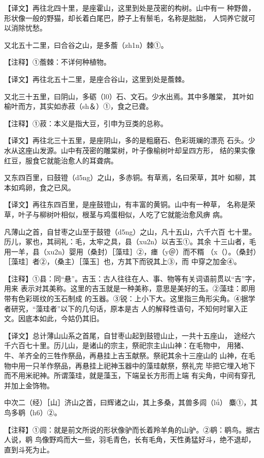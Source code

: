 \documentclass[a4paper,12pt,UTF8,twoside]{ctexbook}
\begin{document}
【译文】再往北四十里，是座霍山，这里到处是茂密的构树。山中有一 种野兽，形状像一般的野猫，却长着白尾巴，脖子上有鬃毛，名称是胐胐， 人饲养它就可以消除忧愁。

又北五十二里，曰合谷之山，是多薝（zh1n）棘①。

【注释】①薝棘：不详何种植物。

【译文】再往北五十二里，是座合谷山，这里到处是薝棘。

又北三十五里，曰阴山，多砺（l0）石、文石。少水出焉。其中多雕棠， 其叶如榆叶而方，其实如赤菽（sh＆）①，食之已聋。

【注释】①菽：本义是指大豆，引申为豆类的总称。

【译文】再往北三十五里，是座阴山，多的是粗磨石、色彩斑斓的漂亮 石头。少水从这座山发源。山中有茂密的雕棠树，叶子像榆树叶却呈四方形， 结的果实像红豆，服食它就能治愈人的耳聋病。

又东四百里，曰鼓镫（d5ng）之山，多赤铜。有草焉，名曰荣草，其叶 如柳，其本如鸡卵，食之已风。

【译文】再往东四百里，是座鼓镫山，有丰富的黄铜。山中有一种草， 名称是荣草，叶子与柳树叶相似，根茎与鸡蛋相似，人吃了它就能治愈风痹 病。

凡薄山之首，自甘枣之山至于鼓镫（d5ng）之山，凡十五山，六千六百 七十里。历儿，冢也，其祠礼：毛，太牢之具，县（xu2n）以吉玉①。其余 十三山者，毛用一羊，县（xu2n）婴用（桑封）［藻珪］②，瘗（y＠）而不糈 （x（）。（桑封）［藻珪］者②，（桑主）［藻玉］也，方其下而锐其上③，而 中穿之加金④。

【注释】①县：同“悬”。吉玉：古人往往在人、事、物等有关词语前贯以“吉”字，用来 表示对其美称。这里的吉玉就是一种美称，意思是美好的玉。②藻珪：即用带有色彩斑纹的玉石制成 的玉器。③锐：上小下大。这里指三角形尖角。④据学者研究，“藻珪者”以下的几句话，原本是古 人的解释性语句，不知何时窜入正文。因底本如此，今姑仍其旧。

【译文】总计薄山山系之首尾，自甘枣山起到鼓镫山止，一共十五座山， 途经六千六百七十里。历儿山，是诸山的宗主，祭祀宗主山山神：在毛物中， 用猪、牛、羊齐全的三牲作祭品，再悬挂上吉玉献祭。祭祀其余十三座山的 山神，在毛物中用一只羊作祭品，再悬挂上祀神玉器中的藻珪献祭，祭礼完 毕把它埋入地下而不用米祀神。所谓藻珪，就是藻玉，下端呈长方形而上端 有尖角，中间有穿孔并加上金饰物。

中次二（经）［山］济山之首，曰辉诸之山，其上多桑，其兽多闾（lǘ） 麋①，其鸟多鹖（h6）②。

【注释】①闾：就是前文所说的形状像驴而长着羚羊角的山驴。②鹖：鹖鸟。据古人说，鹖 鸟像野鸡而大一些，羽毛青色，长有毛角，天性勇猛好斗，绝不退却，直到斗死为止。
\end{document}
